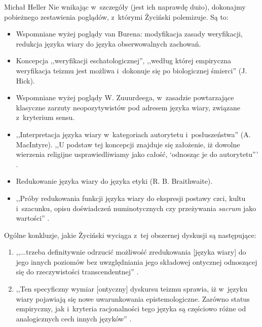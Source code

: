 \begin{artplenv}{Michał Heller}
Nie wnikając w~szczegóły (jest ich naprawdę dużo), dokonajmy pobieżnego zestawienia poglądów, z~którymi Życiński polemizuje. Są to:

\begin{itemize}
\item Wspomniane wyżej poglądy van Burena: modyfikacja zasady weryfikacji, redukcja języka wiary do języka obserwowalnych zachowań.
\item Koncepcja ,,weryfikacji eschatologicznej'', ,,według której empiryczna weryfikacja teizmu jest możliwa i~dokonuje się po biologicznej śmierci''
\parencite[][s.~27]{zycinski_teizm_1985} %
 (J. Hick).
\item Wspomniane wyżej poglądy W. Zuuurdeega, w~zasadzie powtarzające klasyczne zarzuty neopozytywistów pod adresem języka wiary, związane z~kryterium sensu.
\item ,,Interpretacja języka wiary w~kategoriach autorytetu i~posłuszeństwa'' (A. MacIntyre). ,,U podstaw tej koncepcji znajduje się założenie, iż dowolne wierzenia religijne usprawiedliwiamy jako całość, ‘odnosząc je do autorytetu'''
\parencite[][s.~29]{zycinski_teizm_1985}.%

\item Redukowanie języka wiary do języka etyki (R. B. Braithwaite).
\item ,,Próby redukowania funkcji języka wiary do ekspresji postawy czci, kultu i~szacunku, opisu doświadczeń numinotycznych czy przeżywania \textit{sacrum} jako wartości''
\parencite[][s.~31]{zycinski_teizm_1985}.%

\end{itemize}
Ogólne konkluzje, jakie Życiński wyciąga z~tej obszernej dyskusji są następujące:

\begin{enumerate}
\item ,,...trzeba definitywnie odrzucić możliwość zredukowania [języka wiary] do jego innych poziomów bez uwzględniania jego składowej ontycznej odnoszącej się do rzeczywistości transcendentnej''
\parencite[][s.~32]{zycinski_teizm_1985}.%

\item ,,Ten specyficzny wymiar [ontyczny] dyskursu teizmu sprawia, iż w~języku wiary pojawiają się nowe uwarunkowania epistemologiczne. Zarówno status empiryczny, jak i~kryteria racjonalności tego języka są częściowo różne od analogicznych cech innych języków''
\parencite[][s.~32]{zycinski_teizm_1985}.%


\end{enumerate}
\end{artplenv}
